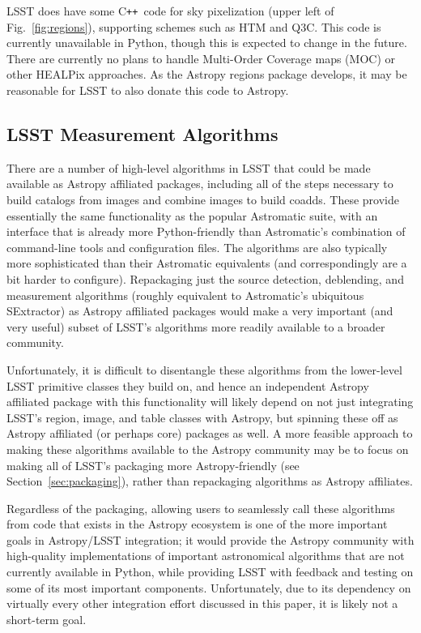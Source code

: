 \documentclass[]{spie}  %
\newcommand{\CPP}{C\texttt{++}\xspace}  %
\begin{document}
LSST does have some \CPP\ code for sky pixelization (upper left of Fig.~\ref{fig:regions}), supporting schemes such as HTM\cite{2001misk.conf..631K} and Q3C\cite{2006ASPC..351..735K}.
This code is currently unavailable in Python, though this is expected to change in the future.
There are currently no plans to handle Multi-Order Coverage maps (MOC)\cite{2012ASPC..461..347F,2014ivoa.spec.0602F} or other HEALPix approaches\cite{2015A&A...580A.132R}.
As the Astropy regions package develops, it may be reasonable for LSST to also donate this code to Astropy.

\subsection{LSST Measurement Algorithms}

There are a number of high-level algorithms in LSST that could be made available as Astropy affiliated packages\cite{bosch_2016_48435}, including all of the steps necessary to build catalogs from images and combine images to build coadds.
These provide essentially the same functionality as the popular Astromatic suite\cite{2012ASSP...29...71B}, with an interface that is already more Python-friendly than Astromatic's combination of command-line tools and configuration files.
The algorithms are also typically more sophisticated than their Astromatic equivalents (and correspondingly are a bit harder to configure).
Repackaging just the source detection, deblending, and measurement algorithms (roughly equivalent to Astromatic's ubiquitous SExtractor) as Astropy affiliated packages would make a very important (and very useful) subset of LSST's algorithms more readily available to a broader community.

Unfortunately, it is difficult to disentangle these algorithms from the lower-level LSST primitive classes they build on, and hence an independent Astropy affiliated package with this functionality will likely depend on not just integrating LSST's region, image, and table classes with Astropy, but spinning these off as Astropy affiliated (or perhaps core) packages as well.
A more feasible approach to making these algorithms available to the Astropy community may be to focus on making all of LSST's packaging more Astropy-friendly (see Section~\ref{sec:packaging}), rather than repackaging algorithms as Astropy affiliates.

Regardless of the packaging, allowing users to seamlessly call these algorithms from code that exists in the Astropy ecosystem is one of the more important goals in Astropy/LSST integration; it would provide the Astropy community with high-quality implementations of important astronomical algorithms that are not currently available in Python, while providing LSST with feedback and testing on some of its most important components.
Unfortunately, due to its dependency on virtually every other integration effort discussed in this paper, it is likely not a short-term goal.
\end{document}
